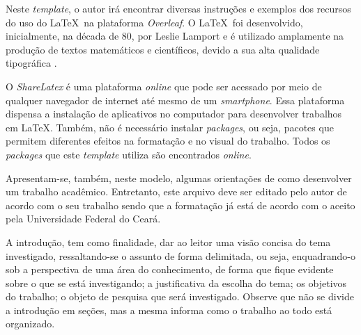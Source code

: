 Neste \textit{template}, o autor irá encontrar diversas instruções e exemplos dos recursos do uso do \LaTeX~na plataforma \textit{Overleaf}. O \LaTeX~foi desenvolvido, inicialmente, na década de 80, por Leslie Lamport e é utilizado amplamente na produção de textos matemáticos e científicos, devido a sua alta qualidade tipográfica \cite{goossens1994latex}. 

O \textit{ShareLatex} é uma plataforma \textit{online} que pode ser acessado por meio de qualquer navegador de internet até mesmo de um \textit{smartphone}. Essa plataforma dispensa a instalação de aplicativos no computador para desenvolver trabalhos em \LaTeX. Também, não é necessário instalar \textit{packages}, ou seja, pacotes que permitem diferentes efeitos na formatação e no visual do trabalho. Todos os \textit{packages} que este \textit{template} utiliza são encontrados \textit{online}. 

Apresentam-se, também, neste modelo, algumas orientações de como desenvolver um trabalho acadêmico. Entretanto, este arquivo deve ser editado pelo autor de acordo com o seu trabalho sendo que a formatação já está de acordo com o aceito pela Universidade Federal do Ceará.  

A introdução, tem como finalidade, dar ao leitor uma visão concisa do tema investigado, ressaltando-se o assunto de forma delimitada, ou seja, enquadrando-o sob a perspectiva de uma área do conhecimento, de forma que fique evidente sobre o que se está investigando; a justificativa da escolha do tema; os objetivos do trabalho; o objeto de pesquisa que será investigado. Observe que não se divide a introdução em seções, mas a mesma informa como o trabalho ao todo está organizado.


\fi


	

	
